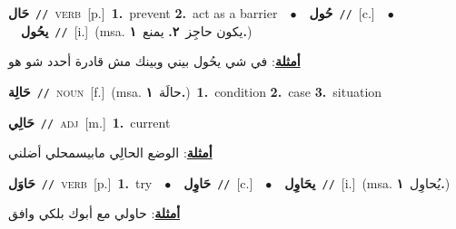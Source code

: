 \documentclass[10pt,a4paper,twoside]{article} %
\begin{document}
\begin{multicols}{2}
{\setlength\topsep{0pt}\textbf{\foreignlanguage{arabic}{حَال}}\ {\color{gray}\texttt{//}\color{black}}\ \textsc{verb}\ [p.]\ \textbf{1.}~prevent  \textbf{2.}~act as a barrier\ \ $\bullet$\ \ \setlength\topsep{0pt}\textbf{\foreignlanguage{arabic}{حُول}}\ {\color{gray}\texttt{//}\color{black}}\ [c.]\ \ $\bullet$\ \ \setlength\topsep{0pt}\textbf{\foreignlanguage{arabic}{يحُول}}\ {\color{gray}\texttt{//}\color{black}}\ [i.]\ \color{gray}(msa. \foreignlanguage{arabic}{يكون حاجِز}~\foreignlanguage{arabic}{\textbf{٢.}}  \foreignlanguage{arabic}{يمنع}~\foreignlanguage{arabic}{\textbf{١.}})\color{black}\  \begin{flushright}\color{gray}\foreignlanguage{arabic}{\textbf{\underline{\foreignlanguage{arabic}{أمثلة}}}: في شي يحُول بيني وبينك مش قادرة أحدد شو هو}\end{flushright}\color{black}} \vspace{2mm}

{\setlength\topsep{0pt}\textbf{\foreignlanguage{arabic}{حَالِة}}\ {\color{gray}\texttt{//}\color{black}}\ \textsc{noun}\ [f.]\ \color{gray}(msa. \foreignlanguage{arabic}{حالَة}~\foreignlanguage{arabic}{\textbf{١.}})\color{black}\ \textbf{1.}~condition  \textbf{2.}~case  \textbf{3.}~situation\ } \vspace{2mm}

{\setlength\topsep{0pt}\textbf{\foreignlanguage{arabic}{حَالِي}}\ {\color{gray}\texttt{//}\color{black}}\ \textsc{adj}\ [m.]\ \textbf{1.}~current\  \begin{flushright}\color{gray}\foreignlanguage{arabic}{\textbf{\underline{\foreignlanguage{arabic}{أمثلة}}}: الوضع الحالِي مابيسمحلي أضلني}\end{flushright}\color{black}} \vspace{2mm}

{\setlength\topsep{0pt}\textbf{\foreignlanguage{arabic}{حَاوَل}}\ {\color{gray}\texttt{//}\color{black}}\ \textsc{verb}\ [p.]\ \textbf{1.}~try\ \ $\bullet$\ \ \setlength\topsep{0pt}\textbf{\foreignlanguage{arabic}{حَاوِل}}\ {\color{gray}\texttt{//}\color{black}}\ [c.]\ \ $\bullet$\ \ \setlength\topsep{0pt}\textbf{\foreignlanguage{arabic}{يحَاوِل}}\ {\color{gray}\texttt{//}\color{black}}\ [i.]\ \color{gray}(msa. \foreignlanguage{arabic}{يُحاوِل}~\foreignlanguage{arabic}{\textbf{١.}})\color{black}\  \begin{flushright}\color{gray}\foreignlanguage{arabic}{\textbf{\underline{\foreignlanguage{arabic}{أمثلة}}}: حاولي مع أبوك بلكي وافق}\end{flushright}\color{black}} \vspace{2mm}


\end{multicols}
\end{document}
